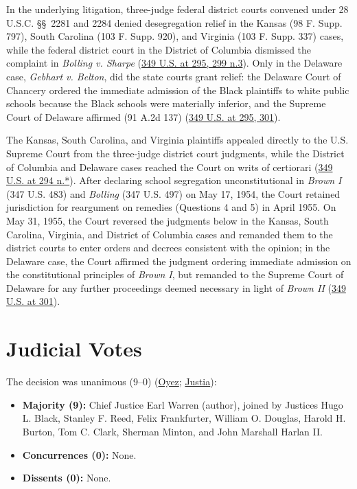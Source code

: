 \documentclass[12pt]{article}
\begin{document}
In the underlying litigation, three-judge federal district courts convened under 28 U.S.C. \S\S~2281 and 2284 denied desegregation relief in the Kansas (98 F. Supp. 797), South Carolina (103 F. Supp. 920), and Virginia (103 F. Supp. 337) cases, while the federal district court in the District of Columbia dismissed the complaint in \textit{Bolling v. Sharpe} (\href{https://supreme.justia.com/cases/federal/us/349/294/}{349 U.S. at 295, 299 n.3}). Only in the Delaware case, \textit{Gebhart v. Belton}, did the state courts grant relief: the Delaware Court of Chancery ordered the immediate admission of the Black plaintiffs to white public schools because the Black schools were materially inferior, and the Supreme Court of Delaware affirmed (91 A.2d 137) (\href{https://supreme.justia.com/cases/federal/us/349/294/}{349 U.S. at 295, 301}).

The Kansas, South Carolina, and Virginia plaintiffs appealed directly to the U.S. Supreme Court from the three-judge district court judgments, while the District of Columbia and Delaware cases reached the Court on writs of certiorari (\href{https://supreme.justia.com/cases/federal/us/349/294/}{349 U.S. at 294 n.*}). After declaring school segregation unconstitutional in \textit{Brown I} (347 U.S. 483) and \textit{Bolling} (347 U.S. 497) on May 17, 1954, the Court retained jurisdiction for reargument on remedies (Questions 4 and 5) in April 1955. On May 31, 1955, the Court reversed the judgments below in the Kansas, South Carolina, Virginia, and District of Columbia cases and remanded them to the district courts to enter orders and decrees consistent with the opinion; in the Delaware case, the Court affirmed the judgment ordering immediate admission on the constitutional principles of \textit{Brown I}, but remanded to the Supreme Court of Delaware for any further proceedings deemed necessary in light of \textit{Brown II} (\href{https://supreme.justia.com/cases/federal/us/349/294/}{349 U.S. at 301}).

\section{Judicial Votes}

The decision was unanimous (9--0) (\href{https://www.oyez.org/cases/1940-1955/349us294}{Oyez}; \href{https://supreme.justia.com/cases/federal/us/349/294/}{Justia}):
\begin{itemize}
  \item \textbf{Majority (9):} Chief Justice Earl Warren (author), joined by Justices Hugo L. Black, Stanley F. Reed, Felix Frankfurter, William O. Douglas, Harold H. Burton, Tom C. Clark, Sherman Minton, and John Marshall Harlan II.
  \item \textbf{Concurrences (0):} None.
  \item \textbf{Dissents (0):} None.
\end{itemize}
\end{document}
